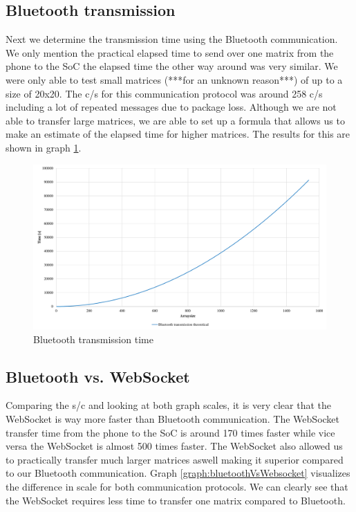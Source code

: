 \documentclass[a4paper, 11pt]{report}
\begin{document}
\subsection{Bluetooth transmission}
Next we determine the transmission time using the Bluetooth communication. We only mention the practical elapsed time to send over one matrix from the phone to the SoC the elapsed time the other way around was very similar. We were only able to test small matrices (***for an unknown reason***) of up to a size of 20x20. The c/s for this communication protocol was around 258 c/s including a lot of repeated messages due to package loss. Although we are not able to transfer large matrices, we are able to set up a formula that allows us to make an estimate of the elapsed time for higher matrices. The results for this are shown in graph \ref{graph:bluetoothTime}.

\begin{figure}[ht]
\centering
\includegraphics[scale=0.45]{images/BluetoothtransmissionSpeed.pdf}
\caption{Bluetooth transmission time}\label{graph:bluetoothTime}
\end{figure}

\subsection{Bluetooth vs. WebSocket}
Comparing the s/c and looking at both graph scales, it is very clear that the WebSocket is way more faster than Bluetooth communication. The WebSocket transfer time from the phone to the SoC is around 170 times faster while vice versa the WebSocket is almost 500 times faster. The WebSocket also allowed us to practically transfer much larger matrices aswell making it superior compared to our Bluetooth communication. Graph \ref{graph:bluetoothVsWebsocket} visualizes the difference in scale for both communication protocols. We can clearly see that the WebSocket requires less time to transfer one matrix compared to Bluetooth.
\end{document}
